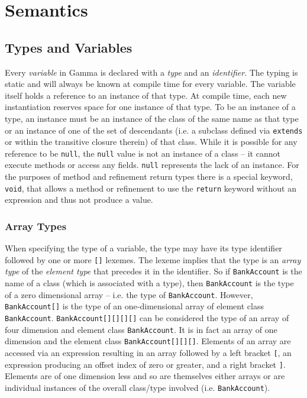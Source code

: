 \section{Semantics}

\subsection{Types and Variables}
Every \textit{variable} in Gamma is declared with a \textit{type} and an \textit{identifier}. The typing is static and will always be known at compile time for every variable. The variable itself holds a reference to an instance of that type. At compile time, each new instantiation reserves space for one instance of that type. To be an instance of a type, an instance must be an instance of the class of the same name as that type or an instance of one of the set of descendants (i.e. a subclass defined via \verb!extends! or within the transitive closure therein) of that class. While it is possible for any reference to be \verb!null!, the \verb!null! value is not an instance of a class -- it cannot execute methods or access any fields. \verb!null! represents the lack of an instance. For the purposes of method and refinement return types there is a special keyword, \verb!void!, that allows a method or refinement to use the \verb!return! keyword without an expression and thus not produce a value.

\subsubsection{Array Types}
When specifying the type of a variable, the type may have its type identifier followed by one or more \verb![]! lexemes. The lexeme implies that the type is an \textit{array type} of the \textit{element type} that precedes it in the identifier. So if \verb!BankAccount! is the name of a class (which is associated with a type), then \verb!BankAccount! is the type of a zero dimensional array -- i.e. the type of \verb!BankAccount!. However, \verb!BankAccount[]! is the type of an one-dimensional array of element class \verb!BankAccount!. \verb!BankAccount[][][][]! can be considered the type of an array of four dimension and element class \verb!BankAccount!. It is in fact an array of one dimension and the element class \verb!BankAccount[][][]!. Elements of an array are accessed via an expression resulting in an array followed by a left bracket \verb![!, an expression producing an offset index of zero or greater, and a right bracket \verb!]!. Elements are of one dimension less and so are themselves either arrays or are individual instances of the overall class/type involved (i.e. \verb!BankAccount!).

